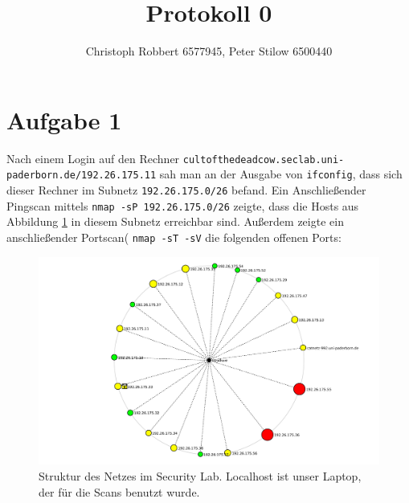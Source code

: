 \documentclass[10pt,a4paper]{article}
\author{Christoph Robbert 6577945, Peter Stilow 6500440}
\title{Protokoll 0}
\begin{document}
\maketitle
 
\section{Aufgabe 1}
Nach einem Login auf den Rechner \texttt{cultofthedeadcow.seclab.uni-paderborn.de/192.26.175.11} sah man an der Ausgabe von \texttt{ifconfig}, dass sich dieser Rechner im Subnetz \texttt{192.26.175.0/26} befand.
Ein Anschließender Pingscan mittels \texttt{nmap -sP 192.26.175.0/26} zeigte, dass die Hosts aus Abbildung \ref{0_netlayout} in diesem Subnetz erreichbar sind.
Außerdem zeigte ein anschließender Portscan( \texttt{nmap -sT -sV} die folgenden offenen Ports:
\begin{figure}
	\label{0_netlayout}
	\includegraphics[scale=0.4]{figures/0_netlayout.pdf}
	\caption{Struktur des Netzes im Security Lab. Localhost ist unser Laptop, der für die Scans benutzt wurde.}
\end{figure}
\end{document}
